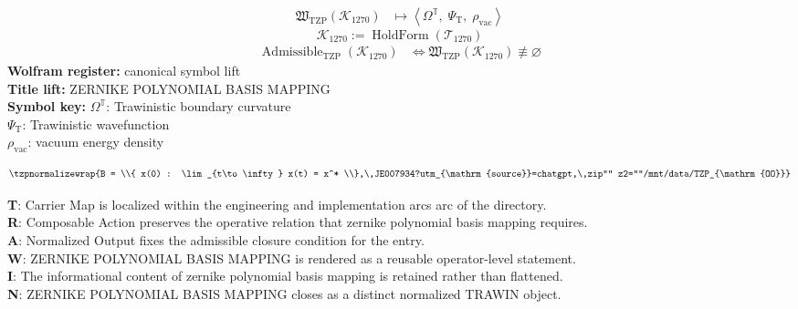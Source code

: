 \noindent
\begin{minipage}[t]{0.48\linewidth}
\begingroup
\small
\[
\begin{aligned}
\mathfrak{W}_{\mathrm{TZP}}\!\left(\mathcal{K}_{1270}\right)
&\longmapsto
\left\langle \Omega^{\mathbb{T}},\; \Psi_{\mathrm{T}},\; \rho_{\mathrm{vac}} \right\rangle
\end{aligned}
\]
\[
\mathcal{K}_{1270}
:=
\operatorname{HoldForm}\!\left(\mathcal{T}_{1270}\right)
\]
\[
\begin{aligned}
\operatorname{Admissible}_{\mathrm{TZP}}\!\left(\mathcal{K}_{1270}\right)
&\Longleftrightarrow
\mathfrak{W}_{\mathrm{TZP}}\!\left(\mathcal{K}_{1270}\right)\not\equiv\varnothing
\end{aligned}
\]
\textbf{Wolfram register:} canonical symbol lift\\
\textbf{Title lift:} ZERNIKE POLYNOMIAL BASIS MAPPING\\
\textbf{Symbol key:} \(\Omega^{\mathbb{T}}\): Trawinistic boundary curvature\\ \(\Psi_{\mathrm{T}}\): Trawinistic wavefunction\\ \(\rho_{\mathrm{vac}}\): vacuum energy density
\par
\endgroup
\end{minipage}\hfill
\begin{minipage}[t]{0.48\linewidth}
\[
\tzpnormalizewrap{B = \\{ x(0) : \lim_{t\to\infty} x(t) = x^* \\},\,JE007934?utm_{\mathrm{source}}=chatgpt,\,zip"" z2=""/mnt/data/TZP_{\mathrm{OO}}}
\]

\small
\textbf{T}: Carrier Map is localized within the engineering and implementation arcs arc of the directory.\\
\textbf{R}: Composable Action preserves the operative relation that zernike polynomial basis mapping requires.\\
\textbf{A}: Normalized Output fixes the admissible closure condition for the entry.\\
\textbf{W}: ZERNIKE POLYNOMIAL BASIS MAPPING is rendered as a reusable operator-level statement.\\
\textbf{I}: The informational content of zernike polynomial basis mapping is retained rather than flattened.\\
\textbf{N}: ZERNIKE POLYNOMIAL BASIS MAPPING closes as a distinct normalized TRAWIN object.
\normalsize
\end{minipage}

